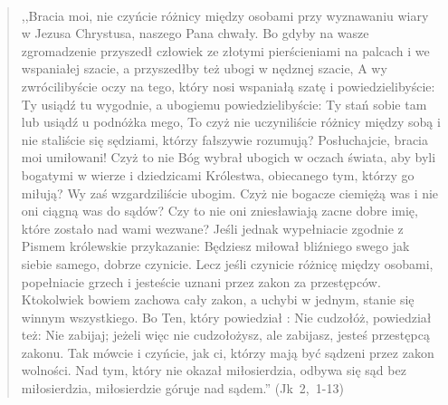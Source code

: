 \documentclass[10pt,a4paper,oneside]{article}
\begin{document}
\paragraph{}
\begin{quote}
,,Bracia moi, nie czyńcie różnicy między osobami przy wyznawaniu wiary w Jezusa Chrystusa, naszego Pana chwały. Bo gdyby na wasze zgromadzenie przyszedł człowiek ze złotymi pierścieniami na palcach i we wspaniałej szacie, a przyszedłby też ubogi w nędznej szacie, A wy zwrócilibyście oczy na tego, który nosi wspaniałą szatę i powiedzielibyście: Ty usiądź tu wygodnie, a ubogiemu powiedzielibyście: Ty stań sobie tam lub usiądź u podnóżka mego, To czyż nie uczyniliście różnicy między sobą i nie staliście się sędziami, którzy fałszywie rozumują? Posłuchajcie, bracia moi umiłowani! Czyż to nie Bóg wybrał ubogich w oczach świata, aby byli bogatymi w wierze i dziedzicami Królestwa, obiecanego tym, którzy go miłują? Wy zaś wzgardziliście ubogim. Czyż nie bogacze ciemiężą was i nie oni ciągną was do sądów? Czy to nie oni zniesławiają zacne dobre imię, które zostało nad wami wezwane? Jeśli jednak wypełniacie zgodnie z Pismem królewskie przykazanie: Będziesz miłował bliźniego swego jak siebie samego, dobrze czynicie. Lecz jeśli czynicie różnicę między osobami, popełniacie grzech i jesteście uznani przez zakon za przestępców. Ktokolwiek bowiem zachowa cały zakon, a uchybi w jednym, stanie się winnym wszystkiego. Bo Ten, który powiedział : Nie cudzołóż, powiedział też: Nie zabijaj; jeżeli więc nie cudzołożysz, ale zabijasz, jesteś przestępcą zakonu. Tak mówcie i czyńcie, jak ci, którzy mają być sądzeni przez zakon wolności. Nad tym, który nie okazał miłosierdzia, odbywa się sąd bez miłosierdzia, miłosierdzie góruje nad sądem.'' \mbox{(Jk 2, 1-13)}
\end{quote}
\end{document}
